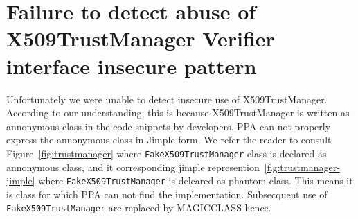 \section{Failure to detect abuse of X509TrustManager Verifier interface insecure pattern}
\label{appendix:X509TrustManager}
Unfortunately we were unable to detect insecure use of X509Trust\-Manager. 
According to our understanding, this is because X509Trust\-Manager is written as
annonymous class in the code snippets by developers. PPA can not properly express 
the  annonymous class in Jimple form. We refer the reader to consult Figure~\ref{fig:trustmanager} 
where \texttt{FakeX509TrustManager} class is declared  as annonymous class,  
and it corresponding jimple represention~\ref{fig:trustmanager-jimple} where
\texttt{FakeX509TrustManager} is delcared as phantom class. 
This means it is class for which PPA can not find the implementation.
Subsecquent use of \texttt{FakeX509Trust\-Manager} are replaced by MAGICCLASS hence.

